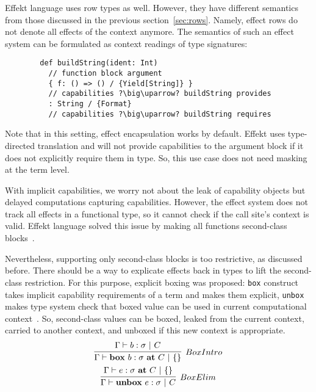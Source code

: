 \documentclass[conference]{IEEEtran}
\newcommand{\ap}{~}
\begin{document}
    Effekt language uses row types as well.
    However, they have different semantics from those discussed in the previous section~\ref{sec:rows}.
    Namely, effect rows do not denote all effects of the context anymore.
    The semantics of such an effect system can be formulated as context readings of type signatures:
    \begin{verbatim}
        def buildString(ident: Int)
          // function block argument
          { f: () => () / {Yield[String]} }
          // capabilities ?\big\uparrow? buildString provides
          : String / {Format}
          // capabilities ?\big\uparrow? buildString requires
    \end{verbatim}

    Note that in this setting, effect encapsulation works by default.
    Effekt uses type-directed translation and will not provide capabilities to the argument block if it does not explicitly require them in type.
    So, this use case does not need masking at the term level.

    With implicit capabilities, we worry not about the leak of capability objects but delayed computations capturing capabilities.
    However, the effect system does not track all effects in a functional type, so it cannot check if the call site's context is valid.
    Effekt language solved this issue by making all functions second-class blocks~\cite{brachthauser2020effects}.

    Nevertheless, supporting only second-class blocks is too restrictive, as discussed before.
    There should be a way to explicate effects back in types to lift the second-class restriction.
    For this purpose, explicit boxing was proposed:
    \texttt{box} construct takes implicit capability requirements of a term and makes them explicit,
    \texttt{unbox} makes type system check that boxed value can be used in current computational context~\cite{hannan1998type, brachthauser2022effects}.
    So, second-class values can be boxed, leaked from the current context, carried to another context, and unboxed if this new context is appropriate.
    \begin{gather*}
        \infer[BoxIntro]{\Gamma \vdash \mathbf{box}\ap b : \sigma~ \mathbf{at}\ap C ~|~ \{\}}{\Gamma \vdash b : \sigma ~|~ C}
        \\
        \infer[BoxElim]{\Gamma \vdash \mathbf{unbox}\ap e : \sigma ~|~ C}{\Gamma \vdash e : \sigma ~\mathbf{at}~C ~|~ \{\}}
    \end{gather*}
\end{document}
